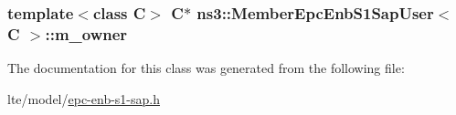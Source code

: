 \subsubsection[{\texorpdfstring{m\+\_\+owner}{m_owner}}]{\setlength{\rightskip}{0pt plus 5cm}template$<$class C$>$ {\bf C}$\ast$ {\bf ns3\+::\+Member\+Epc\+Enb\+S1\+Sap\+User}$<$ {\bf C} $>$\+::m\+\_\+owner\hspace{0.3cm}{\ttfamily [private]}}\hypertarget{classns3_1_1MemberEpcEnbS1SapUser_ab047ea3026f267bb48278bf4898d2b45}{}\label{classns3_1_1MemberEpcEnbS1SapUser_ab047ea3026f267bb48278bf4898d2b45}


The documentation for this class was generated from the following file\+:\begin{DoxyCompactItemize}
\item 
lte/model/\hyperlink{epc-enb-s1-sap_8h}{epc-\/enb-\/s1-\/sap.\+h}\end{DoxyCompactItemize}
